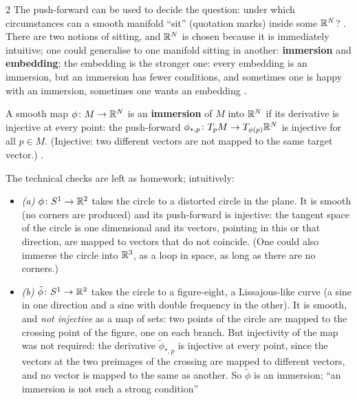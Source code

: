 \begin{paracol}{2}
The push-forward can be used to decide the question: under which circumstances can a smooth manifold ``sit'' (quotation marks) inside some $\mathbb{R}^N$?   . There are two notions of sitting, and $\mathbb{R}^N$ is chosen because it is immediately intuitive; one could generalise to one manifold sitting in another: \textbf{immersion} and
\textbf{embedding}; the embedding is the stronger one: every embedding is an immersion, but an immersion has fewer conditions, and sometimes one is happy with an immersion, sometimes one wants an embedding   .
\begin{definition}\label{def:tb-immersion}
A smooth map $\phi\colon M\to\mathbb{R}^N$ is an \textbf{immersion} of $M$ into $\mathbb{R}^N$ if its derivative is injective at every point: the push-forward $\phi_{*,p}\colon T_pM\to T_{\phi(p)}\mathbb{R}^N$ is injective for all $p\in M$. (Injective: two different vectors are not mapped to the same target vector.)
     .
\end{definition}
\begin{example}\label{ex:tb-circle}
The technical checks are left as homework; intuitively:
\begin{itemize}
  \item \emph{(a)} $\phi\colon S^1\to\mathbb{R}^2$ takes the circle to a distorted circle in the plane. It is smooth (no corners are produced) and its push-forward is injective: the tangent space of the circle is one dimensional and its vectors, pointing in this or that direction, are mapped to vectors that do not coincide.
        (One could also immerse the circle into $\mathbb{R}^3$, as a loop in space, as long as there are no corners.)
  \item \emph{(b)} $\tilde\phi\colon S^1\to\mathbb{R}^2$ takes the circle to a figure-eight, a Lissajous-like curve (a sine in one direction and a sine with double frequency in the other). It is smooth, and \emph{not injective} as a map of sets: two points of the circle are mapped to the crossing point of the figure, one on each branch. But injectivity of
        the map was not required: the derivative $\tilde\phi_{*,p}$ is injective at every point, since the vectors at the two preimages of the crossing are mapped to different vectors, and no vector is mapped to the same as another. So $\tilde\phi$ is an immersion; ``an immersion is not such a strong condition''

\end{itemize}
\end{example}
\end{paracol}
